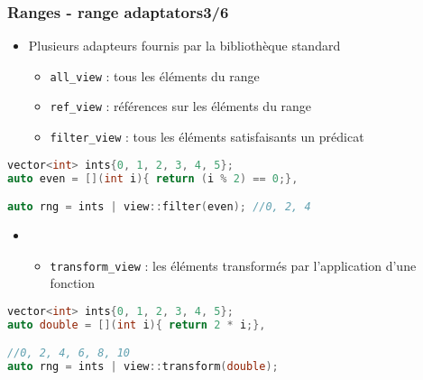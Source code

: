 \documentclass[C++.tex]{subfiles}
\begin{document}
\begin{frame}[fragile]
	\frametitle{Ranges - range adaptators\titlehfill{}3/6}
	\begin{itemize}
		\item Plusieurs adapteurs fournis par la bibliothèque standard


		\begin{itemize}
			\item \lstinline|all_view| : tous les éléments du range
			\item \lstinline|ref_view| : références sur les éléments du range
			\item \lstinline|filter_view| : tous les éléments satisfaisants un prédicat
		\end{itemize}
	\end{itemize}

	\begin{lstlisting}[language=C++]
vector<int> ints{0, 1, 2, 3, 4, 5};
auto even = [](int i){ return (i % 2) == 0;},

auto rng = ints | view::filter(even); //0, 2, 4\end{lstlisting}
 
	\begin{itemize}
		\item [] \begin{itemize}
			\item \lstinline|transform_view| : les éléments transformés par l'application d'une fonction 
		\end{itemize}
	\end{itemize}
	
	\begin{lstlisting}[language=C++]
vector<int> ints{0, 1, 2, 3, 4, 5};
auto double = [](int i){ return 2 * i;},

//0, 2, 4, 6, 8, 10
auto rng = ints | view::transform(double);\end{lstlisting}
\end{frame}
\end{document}
